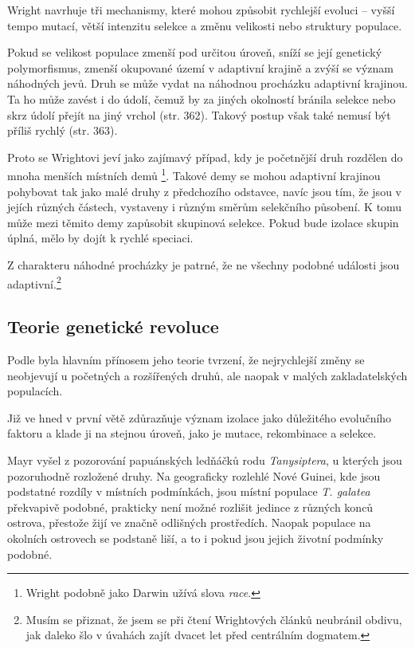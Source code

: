 Wright navrhuje tři mechanismy, které mohou způsobit rychlejší evoluci -- vyšší tempo mutací, větší intenzitu
selekce a změnu velikosti nebo struktury populace.

Pokud se velikost populace zmenší pod určitou úroveň, sníží se její genetický polymorfismus, zmenší
okupované území v adaptivní krajině a zvýší se význam náhodných jevů. Druh se může vydat na náhodnou procházku
adaptivní krajinou. Ta ho může zavést i do údolí, čemuž by za jiných okolností bránila selekce nebo skrz
údolí přejít na jiný vrchol (str. 362). Takový postup však také nemusí být příliš rychlý (str. 363).

Proto se Wrightovi jeví jako zajímavý případ, kdy je početnější druh rozdělen do mnoha menších místních demů \footnote{
Wright podobně jako Darwin užívá slova \textit{race}.
}. Takové demy se mohou adaptivní krajinou pohybovat tak jako malé druhy z předchozího odstavce, navíc jsou tím, že jsou
v jejích různých částech, vystaveny i různým směrům selekčního působení. K tomu může mezi těmito demy zapůsobit
skupinová selekce. Pokud bude izolace skupin úplná, mělo by dojít k rychlé speciaci.

Z charakteru náhodné procházky je patrné, že ne všechny podobné události jsou adaptivní.\footnote{
    Musím se přiznat, že jsem se při čtení Wrightových článků neubránil obdivu, jak daleko šlo v úvahách
    zajít dvacet let před centrálním dogmatem.
}

%

\subsection{Teorie genetické revoluce}

Podle \citep[str. 140]{mayr1989} byla hlavním přínosem jeho teorie tvrzení, že nejrychlejší změny se neobjevují u
početných a rozšířených druhů, ale naopak v malých zakladatelských populacích.

Již ve \citep{mayr1954change} hned v první větě zdůrazňuje význam izolace jako důležitého evolučního faktoru a klade ji
na stejnou úroveň, jako je mutace, rekombinace a selekce.

Mayr vyšel z pozorování papuánských ledňáčků rodu \textit{Tanysiptera}, u kterých jsou pozoruhodně rozložené druhy.
Na geograficky rozlehlé Nové Guinei, kde jsou podstatné rozdíly v místních podmínkách,  jsou místní populace
\textit{T. galatea} překvapivě podobné, prakticky není možné rozlišit jedince z různých konců ostrova, přestože
žijí ve značně odlišných prostředích. Naopak populace na okolních ostrovech se podstaně liší, a to i pokud jsou jejich
životní podmínky podobné.


